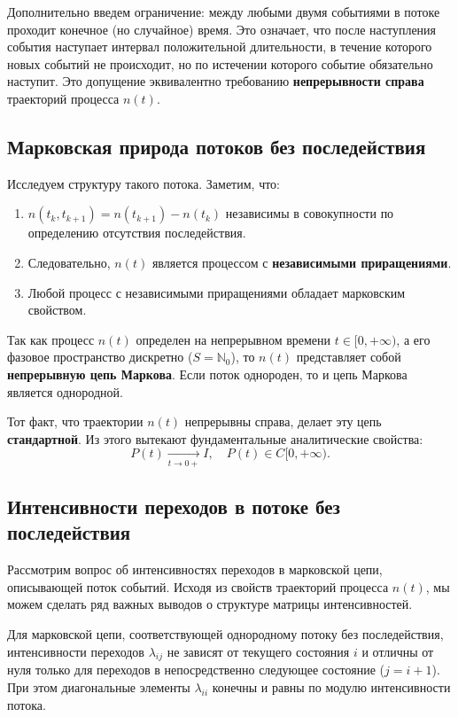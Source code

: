 Дополнительно введем ограничение: между любыми двумя событиями в потоке проходит конечное (но случайное) время. Это означает, что после наступления события наступает интервал положительной длительности, в течение которого новых событий не происходит, но по истечении которого событие обязательно наступит. Это допущение эквивалентно требованию \textbf{непрерывности справа} траекторий процесса $n(t)$.

\subsection{Марковская природа потоков без последействия}

Исследуем структуру такого потока. Заметим, что:
\begin{enumerate}
    \item $n(t_k, t_{k+1}) = n(t_{k+1}) - n(t_k)$ независимы в совокупности по определению отсутствия последействия.
    \item Следовательно, $n(t)$ является процессом с \textbf{независимыми приращениями}.
    \item Любой процесс с независимыми приращениями обладает марковским свойством.
\end{enumerate}

Так как процесс $n(t)$ определен на непрерывном времени $t \in [0, +\infty)$, а его фазовое пространство дискретно ($S = \mathbb{N}_0$), то $n(t)$ представляет собой \textbf{непрерывную цепь Маркова}. Если поток однороден, то и цепь Маркова является однородной.

Тот факт, что траектории $n(t)$ непрерывны справа, делает эту цепь \textbf{стандартной}. Из этого вытекают фундаментальные аналитические свойства:
\begin{equation}
    P(t) \xrightarrow[t \to 0+]{} I, \quad P(t) \in C[0, +\infty).
\end{equation}

\subsection{Интенсивности переходов в потоке без последействия}

Рассмотрим вопрос об интенсивностях переходов в марковской цепи, описывающей поток событий. Исходя из свойств траекторий процесса $n(t)$, мы можем сделать ряд важных выводов о структуре матрицы интенсивностей.

\begin{statement}
Для марковской цепи, соответствующей однородному потоку без последействия, интенсивности переходов $\lambda_{ij}$ не зависят от текущего состояния $i$ и отличны от нуля только для переходов в непосредственно следующее состояние ($j = i+1$). При этом диагональные элементы $\lambda_{ii}$ конечны и равны по модулю интенсивности потока.
\end{statement}

